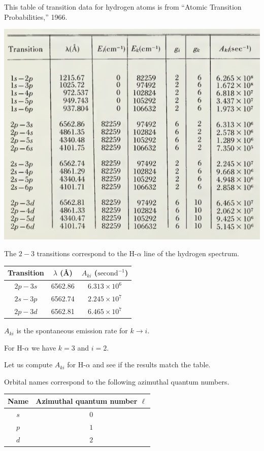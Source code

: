 \documentclass[12pt]{article}
\begin{document}
\noindent
This table of transition data for hydrogen atoms is from ``Atomic Transition Probabilities,'' 1966.

\begin{center}
\includegraphics[scale=0.5]{h-alpha-line.png}
\end{center}

\noindent
The $2-3$ transitions correspond to the H-$\alpha$ line of the hydrogen spectrum.
\begin{center}
\begin{tabular}{|c|c|c|}
\hline
Transition & $\lambda$ (\AA) & $A_{ki}$ ($\text{second}^{-1}$)
\\
\hline
$2p-3s$ & 6562.86 & $6.313\times10^6$
\\
$2s-3p$ & 6562.74 & $2.245\times10^7$
\\
$2p-3d$ & 6562.81 & $6.465\times10^7$
\\
\hline
\end{tabular}
\end{center}

\noindent
$A_{ki}$ is the spontaneous emission rate for $k\rightarrow i$.

\bigskip
\noindent
For H-$\alpha$ we have $k=3$ and $i=2$.

\bigskip
\noindent
Let us compute $A_{ki}$ for H-$\alpha$ and see if the results match the table.

\bigskip
\noindent
Orbital names correspond to the following azimuthal quantum numbers.
\begin{center}
\begin{tabular}{|c|c|}
\hline
Name & Azimuthal quantum number $\ell$
\\
\hline
$s$ & $0$
\\
$p$ & $1$
\\
$d$ & $2$
\\
\hline
\end{tabular}
\end{center}
\end{document}

